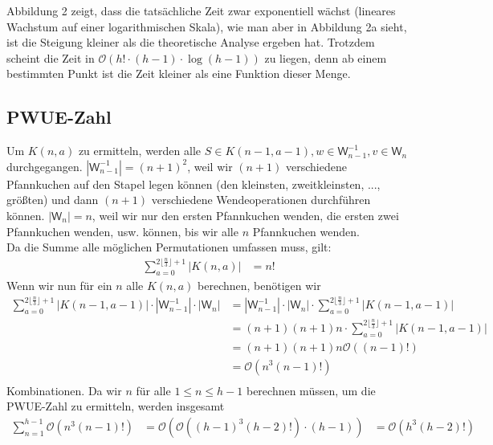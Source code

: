 \documentclass[a4paper,10pt,ngerman]{scrartcl}
\begin{document}
  Abbildung 2 zeigt, dass die tatsächliche Zeit zwar exponentiell wächst (lineares Wachstum auf einer logarithmischen Skala), wie man aber in Abbildung 2a sieht,
  ist die Steigung kleiner als die theoretische Analyse ergeben hat. Trotzdem scheint die Zeit in $\mathcal{O}(h! \cdot (h-1) \cdot \log (h-1))$ zu liegen, denn ab einem
  bestimmten Punkt ist die Zeit kleiner als eine Funktion dieser Menge.
  \subsection{PWUE-Zahl}
  Um $K(n,a)$ zu ermitteln, werden alle $S \in K(n-1, a-1), w \in
\mathsf{W}^{-1}_{n-1}, v \in \mathsf{W}_n$ durchgegangen.
$|\mathsf{W}^{-1}_{n-1}|=(n+1)^2$, weil wir $(n+1)$ verschiedene Pfannkuchen
  auf den Stapel legen können (den kleinsten, zweitkleinsten, ..., größten) und
  dann $(n+1)$ verschiedene Wendeoperationen durchführen können.
$|\mathsf{W}_n|=n$, weil wir nur den ersten Pfannkuchen wenden, die ersten zwei
  Pfannkuchen wenden, usw. können, bis wir alle $n$ Pfannkuchen wenden. \\ Da die
  Summe alle möglichen Permutationen umfassen muss, gilt:
  \begin{align*}
    \sum_{a=0}^{2\lfloor\frac{n}{3}\rfloor+1}|K(n,a)| & =n!
  \end{align*}
  Wenn wir nun für ein $n$ alle $K(n,a)$ berechnen, benötigen wir
  \begin{align*}
    \sum_{a=0}^{2\lfloor\frac{n}{3}\rfloor+1}|K(n-1,a-1)| \cdot |\mathsf{W}^{-1}_{n-1}| \cdot |\mathsf{W}_n|
     & = |\mathsf{W}^{-1}_{n-1}| \cdot |\mathsf{W}_n| \cdot \sum_{a=0}^{2\lfloor\frac{n}{3}\rfloor+1}|K(n-1,a-1)| \\
     & = (n+1)(n+1)n \cdot \sum_{a=0}^{2\lfloor\frac{n}{3}\rfloor+1}|K(n-1,a-1)|                                  \\
     & = (n+1)(n+1)n\mathcal{O}((n-1)!)                                                                           \\
     & = \mathcal{O}(n^3(n-1)!)                                                                                   \\
  \end{align*}
  Kombinationen. Da wir $n$ für alle $1 \leq n \leq h-1$ berechnen müssen, um die PWUE-Zahl zu ermitteln, werden insgesamt
  \begin{align*}
    \sum_{n=1}^{h-1}\mathcal{O}(n^3(n-1)!) & = \mathcal{O}(\mathcal{O}((h-1)^3(h-2)!) \cdot (h-1))
                                           & = \mathcal{O}(h^3(h-2)!)
  \end{align*}
\end{document}
